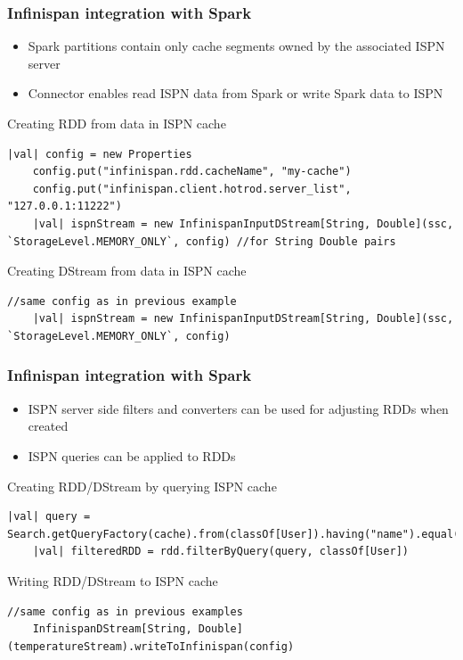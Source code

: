 \documentclass[10pt,utf8]{beamer}
\begin{document}
\begin{frame}[fragile]
	\frametitle{Infinispan integration with Spark}
	\begin{itemize}
		\item Spark partitions contain only cache segments owned by the associated ISPN server
		\item Connector enables read ISPN data from Spark or write Spark data to ISPN
	\end{itemize}
	\vspace{0.3cm}
	Creating RDD from data in ISPN cache
	\begin{lstlisting}[style=Java]
    |val| config = new Properties
    config.put("infinispan.rdd.cacheName", "my-cache")
    config.put("infinispan.client.hotrod.server_list", "127.0.0.1:11222")
    |val| ispnStream = new InfinispanInputDStream[String, Double](ssc, `StorageLevel.MEMORY_ONLY`, config) //for String Double pairs
	\end{lstlisting}
	\vspace{0.3cm}
	Creating DStream from data in ISPN cache
	\begin{lstlisting}[style=Java]
    //same config as in previous example
    |val| ispnStream = new InfinispanInputDStream[String, Double](ssc, `StorageLevel.MEMORY_ONLY`, config)
	\end{lstlisting}
\end{frame}

\begin{frame}[fragile]
	\frametitle{Infinispan integration with Spark}
	\begin{itemize}
	 \item ISPN server side filters and converters can be used for adjusting RDDs when created 
	 \item ISPN queries can be applied to RDDs
	\end{itemize}
	\vspace{0.5cm}
	Creating RDD/DStream by querying ISPN cache
	\begin{lstlisting}[style=Java]
    |val| query = Search.getQueryFactory(cache).from(classOf[User]).having("name").equal("Vojtech").toBuilder[RemoteQuery].build
    |val| filteredRDD = rdd.filterByQuery(query, classOf[User])
	\end{lstlisting}
	\vspace{0.5cm}
	Writing RDD/DStream to ISPN cache
		\begin{lstlisting}[style=Java]
    //same config as in previous examples
    InfinispanDStream[String, Double](temperatureStream).writeToInfinispan(config)
	\end{lstlisting}
\end{frame}
\end{document}
